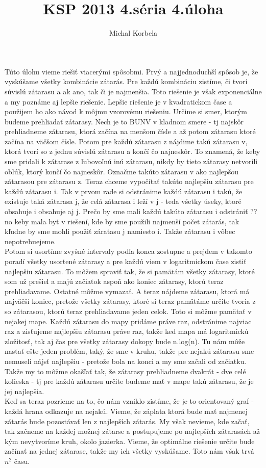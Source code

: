 \documentclass[a4paper,11pt]{article}
\title{KSP 2013 4.séria 4.úloha}
\author{Michal Korbela}
\begin{document}
Túto úlohu vieme riešiť viacerými spôsobmi. Prvý a najjednoduchší spôsob je, že vyskúšame všetky kombinácie zátarás. Pre každú kombináciu zistíme, či tvorí súvislú zátarasu a ak ano, tak či je najmenšia. Toto riešenie je však exponenciálne a my poznáme aj lepšie riešenie.
Lepšie riešenie je v kvadratickom čase a použijem ho ako návod k môjmu vzorovému riešeniu. Určime si smer, ktorým budeme prehliadať zátarasy. Nech je to BUNV v kladnom smere - tj najskôr prehliadneme zátarasu, ktorá začína na menšom čísle a až potom zátarasu ktoré začína na väčšom čísle. Potom pre každú zátarasu z nájdime takú zátarasu v, ktorá tvorí so z jednu súvislú zátarasu a končí čo najneskôr. To znamená, že keby sme pridali k zátarase z ľubovoľnú inú zátarasu, nikdy by tieto zátarasy netvorili oblúk, ktorý končí čo najneskôr. Označme takúto zátarasu v ako najlepšou zátarasou pre zátarasu z. Teraz chceme vypočítať takúto najlepšiu zátarasu pre každú zátarasu i. Tak v prvom rade si odstránime každú zátarasu i takú, že existuje taká zátarasa j, že celá zátarasa i leží v j - teda všetky úseky, ktoré obsahuje i obsahuje aj j. Prečo by sme mali každú takúto zátarasu i odstrániť ?? no keby mala byť v riešení, kde by sme použili najmenší počet zátarás, tak kľudne by sme mohli použiť záratasu j namiesto i. Takže zátarasu i vôbec nepotrebuejeme.\\
Potom si usortíme zvyšné intervaly podľa konca zostupne a prejdem v takomto poradí všetky usortené zátarasy a pre každú viem v logaritmickom čase zistiť najlepšiu zátarasu. To môžem spraviť tak, že si pamätám všetky zátarasy, ktoré som už prešiel a majú začiatok aspoň ako koniec zátarasy, ktorú teraz prehliadavame. Ostatné môžme vymazať. A teraz nájdeme zátarasu, ktorá má najväčší koniec, pretože všetky zátarasy, ktoré si teraz pamätáme určite tvoria z so zátarasou, ktorú teraz prehliadavame jeden celok. Toto si môžme pamätať v nejakej mape. Každú zátarasu do mapy pridáme práve raz, odstránime najviac raz a zisťujeme najlepšiu zátarasu práve raz, takže ked mapa má logaritmickú zložitosť, tak aj čas pre všetky zátarasy dokopy bude n.log(n). Tu nám môže nastať ešte jeden problém, taký, že sme v kruhu, takže pre nejakú zátarasu sme nemuseli nájsť najlepšiu - pretože bola na konci a my sme začali od začiatku. Takže my to môžme okašľať tak, že zátarasy prehliadneme dvakrát - dve celé kolieska - tj pre každú zátarasu určite budeme mať v mape takú zátarasu, že je jej najlepšia.\\
Keď sa teraz pozrieme na to, čo nám vzniklo zistíme, že je to orientovaný graf - každá hrana odkazuje na nejakú. Vieme, že záplata ktorá bude mať najmenej zátarás bude pozostávať len z najlepších zátarás. My však nevieme, kde začať, tak začneme na každej možnej zátarse a postupujeme po najlepších zátarasách až kým nevytvoríme kruh, okolo jazierka. Vieme, že optimálne riešenie určite bude začínať na jednej zátarase, takže my ich všetky vyskúšame. Toto nám však trvá $n^2$ času.\\
\end{document}
